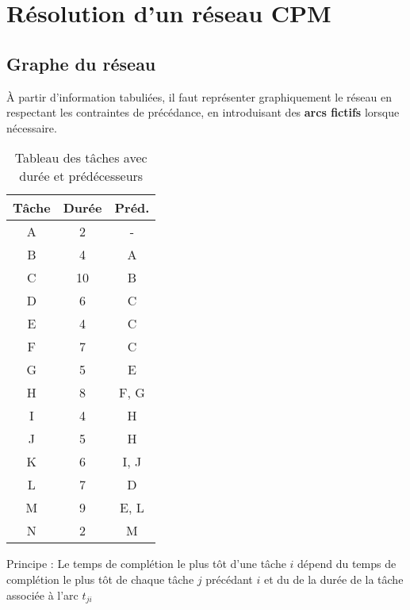 \documentclass{report}
\begin{document}
\begin{multicols*}{2}
\begin{center}
{       
    }
\end{center}

\section{Résolution d'un réseau CPM}
\subsection{Graphe du réseau}
À partir d'information tabuliées, il faut représenter 
graphiquement le réseau en respectant les contraintes de précédance, 
en introduisant des \textbf{arcs fictifs} lorsque nécessaire.  


\begin{table}[H]
    \centering
    \begin{tabular}{|c|c|c|}
        \hline
        \textbf{Tâche} & \textbf{Durée} & \textbf{Préd.} \\
        \hline
        A & 2 & - \\
        B & 4 & A \\
        C & 10 & B \\
        D & 6 & C \\
        E & 4 & C \\
        F & 7 & C \\
        G & 5 & E \\
        H & 8 & F, G \\
        I & 4 & H \\
        J & 5 & H \\
        K & 6 & I, J \\
        L & 7 & D \\
        M & 9 & E, L \\
        N & 2 & M \\
        \hline
    \end{tabular}
    \caption{Tableau des tâches avec durée et prédécesseurs}
\end{table}



Principe :
Le temps de complétion le plus tôt d'une tâche $i$ 
dépend du temps de complétion le plus tôt de chaque tâche $j$ précédant 
$i$ et du de la durée de la tâche associée à l'arc $t_{ji}$


\end{multicols*}
\end{document}
